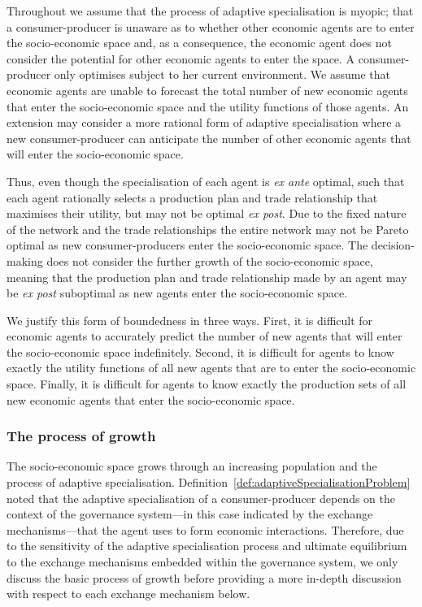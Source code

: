 Throughout we assume that the process of adaptive specialisation is myopic; that a consumer-producer is unaware as to whether other economic agents are to enter the socio-economic space and, as a consequence, the economic agent does not consider the potential for other economic agents to enter the space. A consumer-producer only optimises subject to her current environment. We assume that economic agents are unable to forecast the total number of new economic agents that enter the socio-economic space and the utility functions of those agents. An extension may consider a more rational form of adaptive specialisation where a new consumer-producer can anticipate the number of other economic agents that will enter the socio-economic space.

Thus, even though the specialisation of each agent is \emph{ex ante} optimal, such that each agent rationally selects a production plan and trade relationship that maximises their utility, but may not be optimal \emph{ex post}. Due to the fixed nature of the network and the trade relationships the entire network may not be Pareto optimal as new consumer-producers enter the socio-economic space. The decision-making does not consider the further growth of the socio-economic space, meaning that the production plan and trade relationship made by an agent may be \emph{ex post} suboptimal as new agents enter the socio-economic space.

We justify this form of boundedness in three ways. First, it is difficult for economic agents to accurately predict the number of new agents that will enter the socio-economic space indefinitely. Second, it is difficult for agents to know exactly the utility functions of all new agents that are to enter the socio-economic space. Finally, it is difficult for agents to know exactly the production sets of all new economic agents that enter the socio-economic space.

\subsubsection{The process of growth}

The socio-economic space grows through an increasing population and the process of adaptive specialisation. Definition~\ref{def:adaptiveSpecialisationProblem} noted that the adaptive specialisation of a consumer-producer depends on the context of the governance system---in this case indicated by the exchange mechanisms---that the agent uses to form economic interactions. Therefore, due to the sensitivity of the adaptive specialisation process and ultimate equilibrium to the exchange mechanisms embedded within the governance system, we only discuss the basic process of growth before providing a more in-depth discussion with respect to each exchange mechanism below.

